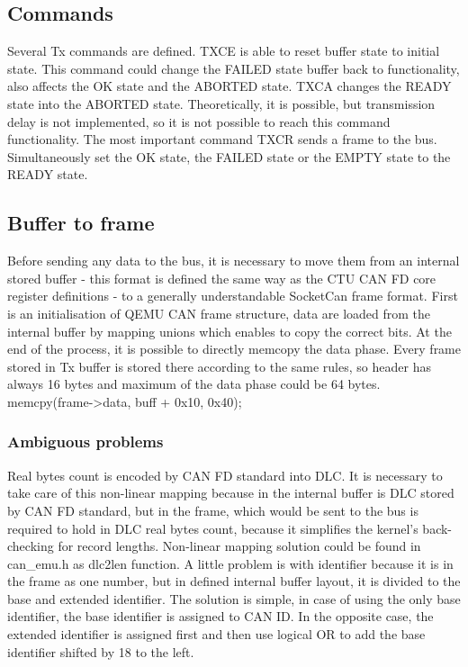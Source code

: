 \documentclass{ctuthesis}
\begin{document}
 \subsection{Commands}
  Several Tx commands are defined. TXCE is able to reset buffer state to initial state. This command could change the FAILED state buffer back to functionality, also affects the OK state and the ABORTED state. TXCA changes the READY state into the ABORTED state. Theoretically, it is possible, but transmission delay is not implemented, so it is not possible to reach this command functionality. The most important command TXCR sends a frame to the bus. Simultaneously set the OK state, the FAILED state or the EMPTY state to the READY state.
 
 \subsection{Buffer to frame}
  Before sending any data to the bus, it is necessary to move them from an internal stored buffer - this format is defined the same way as the CTU CAN FD core register definitions - to a generally understandable SocketCan frame format. First is an initialisation of QEMU CAN frame structure, data are loaded from the internal buffer by mapping unions which enables to copy the correct bits. At the end of the process, it is possible to directly memcopy the data phase. Every frame stored in Tx buffer is stored there according to the same rules, so header has always 16 bytes and maximum of the data phase could be 64 bytes.
  memcpy(frame->data, buff + 0x10, 0x40);
 
  \subsubsection{Ambiguous problems}
   Real bytes count is encoded by CAN FD standard into DLC. It is necessary to take care of this non-linear mapping because in the internal buffer is DLC stored by CAN FD standard, but in the frame, which would be sent to the bus is required to hold in DLC real bytes count, because it simplifies the kernel's back-checking for record lengths. Non-linear mapping solution could be found in can\_emu.h as dlc2len function. A little problem is with identifier because it is in the frame as one number, but in defined internal buffer layout, it is divided to the base and extended identifier. The solution is simple, in case of using the only base identifier, the base identifier is assigned to CAN ID. In the opposite case, the extended identifier is assigned first and then use logical OR to add the base identifier shifted by 18 to the left. 
   
\end{document}

